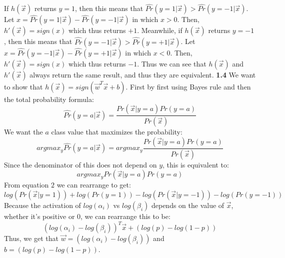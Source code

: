 \documentclass{article} %
\begin{document}
If $h(\vec{x})$ returns $y=1$, then this means that $\hat{Pr}(y=1|\vec{x}) > \hat{Pr}(y = -1|\vec{x})$. Let $x = \hat{Pr}(y=1|\vec{x}) - \hat{Pr}(y = -1|\vec{x})$ in which $x > 0$. Then, $h'(\vec{x}) = sign(x)$ which thus returns $+1$. Meanwhile, if $h(\vec{x})$ returns $y=-1$, then this means that $\hat{Pr}(y=-1|\vec{x}) > \hat{Pr}(y = +1|\vec{x})$. Let $x = \hat{Pr}(y=-1|\vec{x}) - \hat{Pr}(y = +1|\vec{x})$ in which $x < 0$. Then, $h'(\vec{x}) = sign(x)$ which thus returns $-1$. Thus we can see that $h(\vec{x})$ and $h'(\vec{x})$ always return the same result, and thus they are equivalent. \newline\newline
\textbf{1.4}
 We want to show that $h(\vec{x}) = sign(\vec{w}^T\vec{x} + b)$. First by first using Bayes rule and then the total probability formula: $$\hat{Pr}(y=a|\vec{x}) = \frac{Pr(\vec{x}|y=a)Pr(y=a)}{Pr(\vec{x})}$$
We want the $a$ class value that maximizes the probability:
$$argmax_{y} \hat{Pr}(y=a|\vec{x}) = argmax_{y}\frac{Pr(\vec{x}|y=a)Pr(y=a)}{Pr(\vec{x})}$$
Since the denominator of this does not depend on $y$, this is equivalent to: $$argmax_{y}Pr(\vec{x}|y=a)Pr(y=a)$$
From equation $2$ we can rearrange to get: 
$$log(Pr(\vec{x}|y=1)) + log(Pr(y=1)) - log(Pr(\vec{x}|y=-1)) - log(Pr(y=-1))$$
Because the activation of $log(\alpha_i)$ vs $log(\beta_i)$ depends on the value of $\vec{x}$, whether it's positive or $0$, we can rearrange this to be: 
$$(log(\alpha_i) - log(\beta_i))^T\vec{x} + (log(p) - log(1-p))$$
Thus, we get that $\vec{w} = (log(\alpha_i) - log(\beta_i))$ and $b = (log(p) - log(1-p))$.
\end{document}

